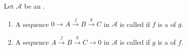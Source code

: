 \begin{definition} \label{definition:left_right_exact_sequences_in_an_additive_category}
Let $\mathcal{A}$ be an . 

\begin{enumerate}
    \item A sequence $0 \to A \xrightarrow{f} B \xrightarrow{g} C$ in $\mathcal{A}$ is called  if $f$ is a  of $g$. 
    
    \item A sequence $A \xrightarrow{f} B \xrightarrow{g} C \to 0$ in $\mathcal{A}$ is called  if $g$ is a  of $f$.
\end{enumerate}

\end{definition}